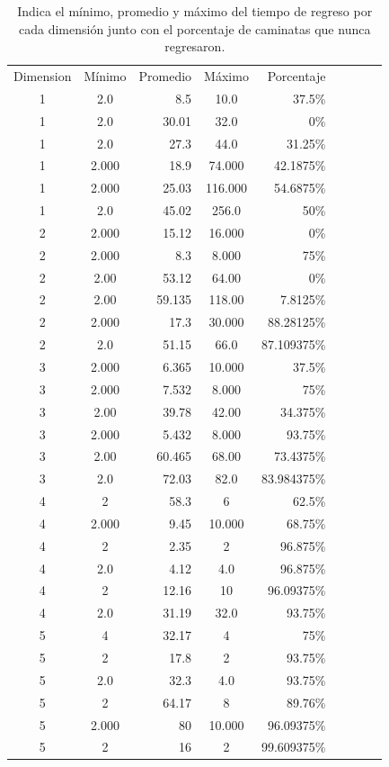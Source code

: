\documentclass[a4paper]{article}
\begin{document}
\begin{table}[h!]
    \caption{Indica el mínimo, promedio y máximo del tiempo de regreso por cada dimensión junto con el porcentaje de caminatas que nunca regresaron.}
    \label{tabla1}
    \centering
    \bigskip
    \begin{tabular}{||c||cr||cr||cr||cr|}
    Dimension & Mínimo &  Promedio & Máximo & Porcentaje\\
    1 & 2.0 &  8.5 & 10.0 & 37.5\% \\ 
    1 & 2.0 &  30.01 & 32.0 & 0\%  \\ 
    1 & 2.0 &  27.3 & 44.0 & 31.25\% \\ 
    1 & 2.000 &  18.9 & 74.000 & 42.1875\% \\
    1 & 2.000 &  25.03 & 116.000 & 54.6875\% \\
    1 & 2.0 &  45.02 & 256.0 & 50\% \\
    2 & 2.000 &  15.12 & 16.000 & 0\% \\
    2 & 2.000 &  8.3 & 8.000 & 75\% \\
    2 & 2.00 &  53.12 & 64.00 & 0\% \\
    2 & 2.00 &  59.135 & 118.00 & 7.8125\% \\
    2 & 2.000 &  17.3 & 30.000 & 88.28125\% \\
    2 & 2.0 &  51.15 & 66.0 & 87.109375\% \\
    3 & 2.000 &  6.365 & 10.000 & 37.5\% \\
    3 & 2.000 &  7.532 & 8.000 & 75\% \\
    3 & 2.00 &  39.78 & 42.00 & 34.375\% \\
    3 & 2.000 &  5.432 & 8.000 & 93.75\% \\
    3 & 2.00 &  60.465 & 68.00 & 73.4375\% \\
    3 & 2.0 &  72.03 & 82.0 & 83.984375\% \\
    4 & 2 &  58.3 & 6 & 62.5\% \\
    4 & 2.000 &  9.45 & 10.000 & 68.75\% \\
    4 & 2 &  2.35 & 2 & 96.875\% \\
    4 & 2.0 &  4.12 & 4.0 & 96.875\% \\
    4 & 2 &  12.16 & 10 & 96.09375\% \\
    4 & 2.0 &  31.19 & 32.0 & 93.75\% \\
    5 & 4 &  32.17 & 4 & 75\% \\
    5 & 2 &  17.8 & 2 & 93.75\% \\
    5 & 2.0 &  32.3 & 4.0 & 93.75\% \\
    5 & 2 &  64.17 & 8 & 89.76\% \\
    5 & 2.000 &  80 & 10.000 & 96.09375\% \\
    5 & 2 &  16 & 2 & 99.609375\% \\
    \end{tabular}
\end{table}
\end{document}
